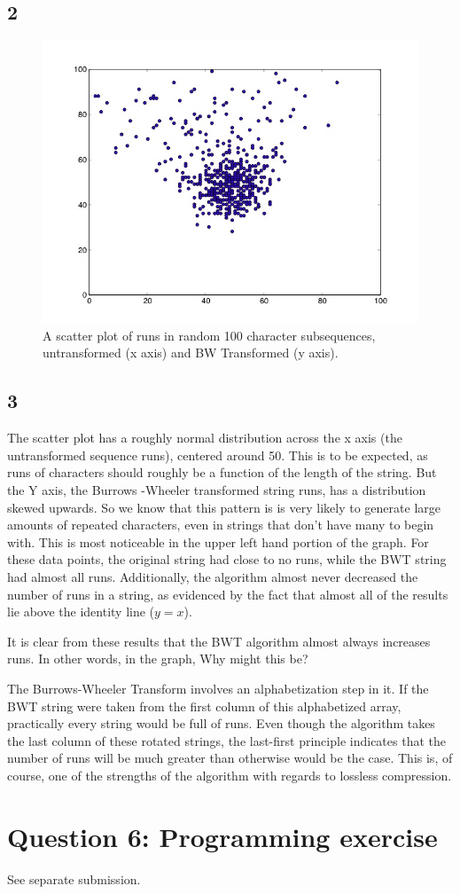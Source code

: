 \documentclass[12pt]{article}
\begin{document}
\subsection*{2}
\begin{figure}[h]
\centering 
\includegraphics[width=4.5in]{scatter.jpg}
\caption{A scatter plot of runs in random 100 character subsequences, untransformed (x axis) and BW Transformed (y axis).}
\label{scatter}
\end{figure}

\subsection*{3}  The scatter plot has a roughly normal distribution across the x axis (the untransformed sequence runs), centered around 50.  This is to be expected, as runs of characters should roughly be a function of the length of the string.  But the Y axis, the Burrows -Wheeler transformed string runs, has a distribution skewed upwards.  So we know that this pattern is is very likely to generate large amounts of repeated characters, even in strings that don't have many to begin with.  This is most noticeable in the upper left hand portion of the graph.  For these data points, the original string had close to no runs, while the BWT string had almost all runs.  Additionally, the algorithm almost never decreased the number of runs in a string, as evidenced by the fact that almost all of the results lie above the identity line ($y = x$).

It is clear from these results that the BWT algorithm almost always increases runs.  In other words, in the graph,   Why might this be?

The Burrows-Wheeler Transform involves an alphabetization step in it.  If the BWT string were taken from the first column of this alphabetized array, practically every string would be full of runs.  Even though the algorithm takes the last column of these rotated strings, the last-first principle indicates that the number of runs will be much greater than otherwise would be the case.  This is, of course, one of the strengths of the algorithm with regards to lossless compression. 

\section*{Question 6: Programming exercise}
See separate submission.
\end{document}
